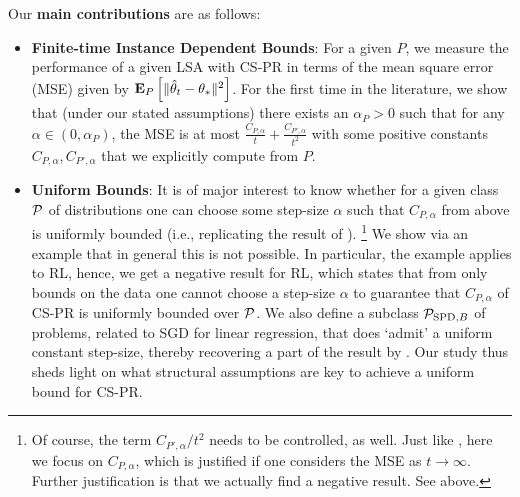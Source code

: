 Our \textbf{main contributions} are as follows:
\begin{itemize}[leftmargin=*]%
\item \textbf{Finite-time Instance Dependent Bounds}: For a given $P$, we  measure the performance of a given LSA with CS-PR in terms of the mean square error (MSE) given by $\EEP{\normsm{\thh_t-\ts}^2}$. 
For the first time in the literature,
we show that (under our stated assumptions) there exists an $\alpha_P>0$ such that 
for any $\alpha\in (0,\alpha_P)$,
the MSE %
is at most $\frac{C_{P,\alpha}}{t}+\frac{C_{P',\alpha}}{t^2}$ with some positive constants $C_{P,\alpha},C_{P',\alpha}$ that we explicitly compute from $P$.
\item \textbf{Uniform Bounds}:
It is of major interest to know whether for a given class $\P$ of distributions 
one can choose some step-size $\alpha$ 
such that $C_{P,\alpha}$ from above is uniformly bounded (i.e., replicating the result of \citet{bach}).%
\footnote{Of course, the term $C_{P',\alpha}/t^2$ needs to be controlled, as well. Just like \citet{bach}, here we focus on $C_{P,\alpha}$, which is justified if one considers the MSE as $t\to\infty$. Further justification is that we actually find a negative result. See above.}
We show via an example that in general this is not possible.
In particular, the example applies to RL, hence, we get a negative result for RL, which states that from only bounds on the data one cannot choose a step-size $\alpha$ to guarantee that $C_{P,\alpha}$ of CS-PR is uniformly bounded over $\P$.
We also define a subclass  $\P_{\text{SPD},B}$ of problems, related to SGD for linear regression, that does `admit' a uniform constant step-size, thereby recovering a part of the result by \citet{bach}.  Our study thus sheds light on what structural assumptions are key to achieve a uniform bound for CS-PR.

\end{itemize}
